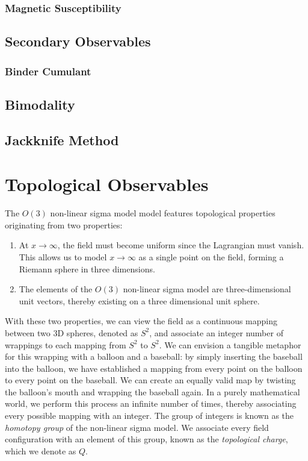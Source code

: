 \documentclass[12pt]{report}
\begin{document}
\subsubsection{Magnetic Susceptibility}


\subsection{Secondary Observables}
\subsubsection{Binder Cumulant}
\subsection{Bimodality}


\subsection{Jackknife Method}
\section{Topological Observables}
\label{sec:topological charge}
The $O(3)$ non-linear sigma model model features topological properties originating from two properties: 
\begin{enumerate}
    \item At $x\rightarrow\infty$, the field must become uniform since the Lagrangian must vanish. This allows us to model $x\rightarrow\infty$ as a single point on the field, forming a Riemann sphere in three dimensions.
    \item The elements of the $O(3)$ non-linear sigma model are three-dimensional unit vectors, thereby existing on a three dimensional unit sphere. 
\end{enumerate}

With these two properties, we can view the field as a continuous mapping between two 3D spheres, denoted as $S^2$, and associate an integer number of wrappings to each mapping from $S^2$ to $S^2$. We can envision a tangible metaphor for this wrapping with a balloon and a baseball: by simply inserting the baseball into the balloon, we have established a mapping from every point on the balloon to every point on the baseball. We can create an equally valid map by twisting the balloon's mouth and wrapping the baseball again. In a purely mathematical world, we perform this process an infinite number of times, thereby associating every possible mapping with an integer. The group of integers is known as the \textit{homotopy group} of the non-linear sigma model. We associate every field configuration with an element of this group, known as the \textit{topological charge}, which we denote as $Q$.
\end{document}
